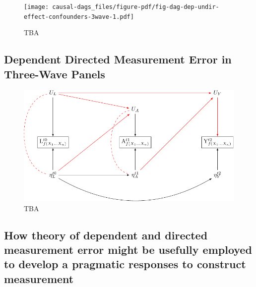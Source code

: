 \documentclass[
  singlecolumn]{report}
\begin{document}
\begin{figure}

{\centering \texttt{[image: causal-dags\_files/figure-pdf/fig-dag-dep-undir-effect-confounders-3wave-1.pdf]}

}

\caption{\label{fig-dag-dep-undir-effect-confounders-3wave}TBA}

\end{figure}

\hypertarget{dependent-directed-measurement-error-in-three-wave-panels}{%
\subsection{Dependent Directed Measurement Error in Three-Wave
Panels}\label{dependent-directed-measurement-error-in-three-wave-panels}}

\begin{figure}

{\centering \includegraphics[width=1\textwidth,height=\textheight]{causal-dags_files/figure-pdf/fig-dag-dep-udir-effect-confounders-3wave-1.pdf}

}

\caption{\label{fig-dag-dep-udir-effect-confounders-3wave}TBA}

\end{figure}

\hypertarget{how-theory-of-dependent-and-directed-measurement-error-might-be-usefully-employed-to-develop-a-pragmatic-responses-to-construct-measurement}{%
\subsection{How theory of dependent and directed measurement error might
be usefully employed to develop a pragmatic responses to construct
measurement}\label{how-theory-of-dependent-and-directed-measurement-error-might-be-usefully-employed-to-develop-a-pragmatic-responses-to-construct-measurement}}
\end{document}
